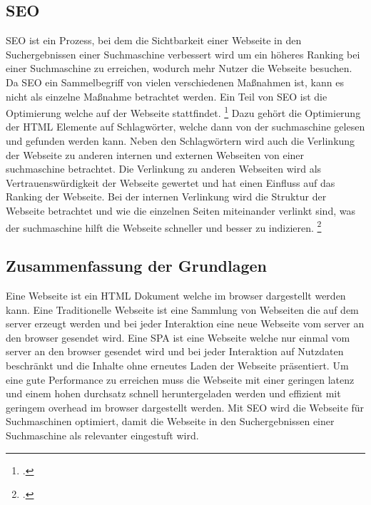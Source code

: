 \subsection{\ac{SEO}}
\ac{SEO} ist ein Prozess, bei dem die Sichtbarkeit einer Webseite in den Suchergebnissen einer Suchmaschine verbessert wird um ein höheres Ranking bei einer Suchmaschine zu erreichen,
wodurch mehr Nutzer die Webseite besuchen.
Da \ac{SEO} ein Sammelbegriff von vielen verschiedenen Maßnahmen ist, kann es nicht als einzelne Maßnahme betrachtet werden.
Ein Teil von \ac{SEO} ist die Optimierung welche auf der Webseite stattfindet. \footcite[Vgl][Seite 13]{Robbins2018}
Dazu gehört die Optimierung der \ac{HTML} Elemente auf Schlagwörter, welche dann von der \gls{suchmaschine} gelesen und gefunden werden kann.
Neben den Schlagwörtern wird auch die Verlinkung der Webseite zu anderen internen und externen Webseiten von einer \gls{suchmaschine} betrachtet.
Die Verlinkung zu anderen Webseiten wird als Vertrauenswürdigkeit der Webseite gewertet und hat einen Einfluss auf das Ranking der Webseite.
Bei der internen Verlinkung wird die Struktur der Webseite betrachtet und wie die einzelnen Seiten miteinander verlinkt sind, was der \gls{suchmaschine} hilft die Webseite schneller und besser zu indizieren.
\footcite[Vgl.][Seite 5]{John2016}

\subsection*{Zusammenfassung der Grundlagen}
Eine Webseite ist ein \ac{HTML} Dokument welche im \gls{browser} dargestellt werden kann.
Eine Traditionelle Webseite ist eine Sammlung von Webseiten die auf dem \gls{server} erzeugt werden und bei jeder Interaktion eine neue Webseite vom \gls{server} an den \gls{browser} gesendet wird.
Eine \ac{SPA} ist eine Webseite welche nur einmal vom \gls{server} an den \gls{browser} gesendet wird und bei jeder Interaktion auf Nutzdaten beschränkt und die Inhalte ohne erneutes Laden der Webseite präsentiert.
Um eine gute Performance zu erreichen muss die Webseite mit einer geringen \gls{latenz} und einem hohen \gls{durchsatz} schnell heruntergeladen werden
und effizient mit geringem \gls{overhead} im \gls{browser} dargestellt werden.
Mit \ac{SEO} wird die Webseite für Suchmaschinen optimiert, damit die Webseite in den Suchergebnissen einer Suchmaschine als relevanter eingestuft wird.

